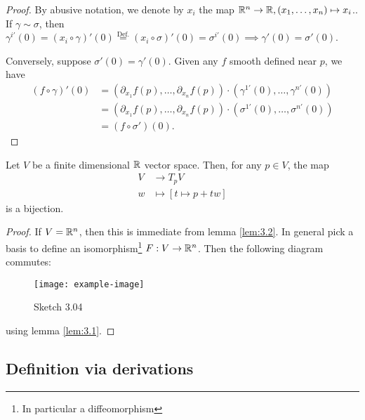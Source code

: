 \begin{proof}
    By abusive notation, we denote by \(x_i\) the map \(\mathbb{R}^n\to\mathbb{R}, (x_1,\dots,x_n)\mapsto x_i\)..
    If \(\gamma\sim\sigma\), then \(\gamma^{i'}(0)=(x_i\circ \gamma)'(0)\stackrel{\text{Def.}}{=}(x_i\circ\sigma)'(0)=\sigma^{i'}(0)\implies \gamma'(0)=\sigma'(0)\).

    Conversely, suppose \(\sigma'(0)=\gamma'(0)\). Given any \(f\) smooth defined near \(p\), we have 
    \begin{align*}
        (f\circ \gamma)'(0)&=(\partial_{x_1} f(p),\dots,\partial_{x_n} f(p) )\cdot (\gamma^{1'}(0),\dots,\gamma^{n'}(0))\\
        &=(\partial_{x_1} f(p),\dots,\partial_{x_n} f(p) )\cdot (\sigma^{1'}(0),\dots,\sigma^{n'}(0)) \\
        &=(f\circ \sigma')(0).
    \end{align*}
\end{proof}


\begin{corollary}\label{cor:3.3}
    Let \(V\) be a finite dimensional \(\mathbb{R}\) vector space. Then, for any \(p\in V\), the  map 
    \begin{align*}
        V&\to T_p V\\
        w&\mapsto [t\mapsto p + tw]
    \end{align*}
    is a bijection.
\end{corollary}

\begin{proof}
If \(V=\mathbb{R}^n\), then this is immediate from lemma \ref{lem:3.2}. In general pick a basis 
to define an isomorphism\footnote{In particular a diffeomorphism} \(F:V\to\mathbb{R}^n\). Then the following diagram commutes:
\begin{figure}[H]
    \centering
    \texttt{[image: example-image]}
    \caption{Sketch 3.04}
\end{figure}    
using lemma \ref{lem:3.1}.
\end{proof}

\subsection{Definition via derivations}

